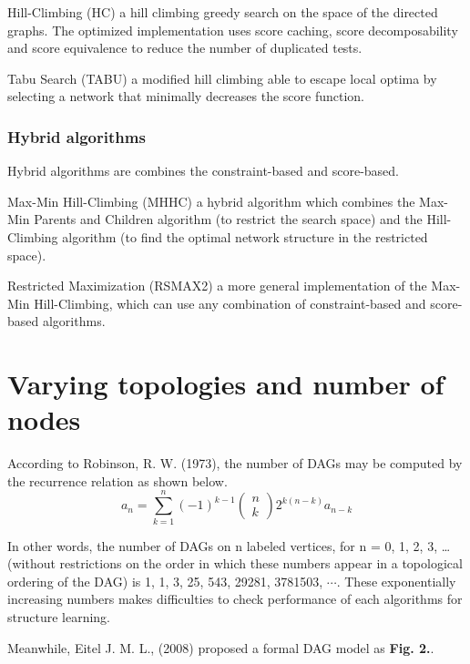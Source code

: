 \documentclass[runningheads,a4paper]{llncs}
\begin{document}
Hill-Climbing (HC) a hill climbing greedy search on the space of the directed graphs. The optimized implementation uses score caching, score decomposability and score equivalence to reduce the number of duplicated tests.
	
Tabu Search (TABU) a modified hill climbing able to escape local optima by selecting a network that minimally decreases the score function.



\subsubsection{Hybrid algorithms}

Hybrid algorithms are combines the constraint-based and score-based.

Max-Min Hill-Climbing (MHHC) a hybrid algorithm which combines the Max-Min Parents and Children algorithm (to restrict the search space) and the Hill-Climbing algorithm (to find the optimal network structure in the restricted space).
	
Restricted Maximization (RSMAX2) a more general implementation of the Max-Min Hill-Climbing, which can use any combination of constraint-based and score-based algorithms.





\section{Varying topologies and number of nodes}


According to Robinson, R. W. (1973), the number of DAGs may be computed by the recurrence relation as shown below.
$$a_{n}=\sum_{k=1}^{n}(-1)^{k-1}\left(\begin{array}{c}
n\\
k
\end{array}\right)2^{k(n-k)}a_{n-k}$$

In other words, the number of DAGs on n labeled vertices, for n = 0, 1, 2, 3, … (without restrictions on the order in which these numbers appear in a topological ordering of the DAG) is 1, 1, 3, 25, 543, 29281, 3781503, $\cdots$.
These exponentially increasing numbers makes difficulties to check performance of each algorithms for structure learning.


Meanwhile, Eitel J. M. L., (2008) proposed a formal DAG model as \textbf{Fig. 2.}.
\end{document}

